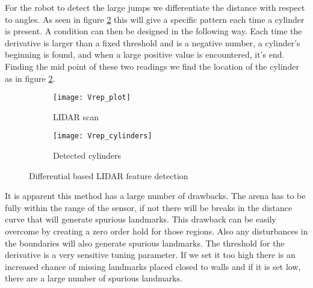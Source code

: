 For the robot to detect the large jumps we differentiate the distance with respect to angles. As seen in figure \ref{fig:Vrep_cylinders} this will give a specific pattern each time a cylinder is present. A condition can then be designed in the following way. Each time the derivative is larger than a fixed threshold and is a negative number, a cylinder's beginning is found, and when a large positive value is encountered, it's end. Finding the mid point of these two readings we find the location of the cylinder as in figure \ref{fig:Vrep_cylinders}. 
\begin{figure}
        \centering

        \begin{subfigure}[b]{0.48\textwidth}
                \texttt{[image: Vrep\_plot]}
                \caption{LIDAR scan}
                \label{fig:Vrep_plot}
        \end{subfigure}
        \quad %
        \quad %
        \begin{subfigure}[b]{0.48\textwidth}
                \texttt{[image: Vrep\_cylinders]}
                \caption{Detected cylinders}
                \label{fig:Vrep_cylinders}
        \end{subfigure}

        \caption{Differential based LIDAR feature detection}\label{fig:Simulated_2}
\end{figure}

It is apparent this method has a large number of drawbacks. The arena has to be fully within the range of the sensor, if not there will be breaks in the distance curve that will generate spurious landmarks. This drawback can be easily overcome by creating a zero order hold for those regions. Also any disturbances in the boundaries will also generate spurious landmarks. The threshold for the derivative is a very sensitive tuning parameter. If we set it too high there is an increased chance of missing landmarks placed closed to walls and if it is set low, there are a large number of spurious landmarks. 

